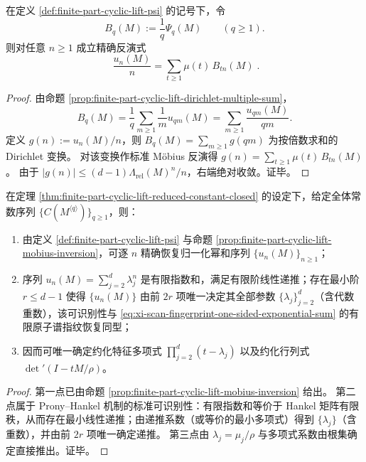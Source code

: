 \begin{proposition}\label{prop:finite-part-cyclic-lift-mobius-inversion}
在定义 \ref{def:finite-part-cyclic-lift-psi} 的记号下，令
\[
B_q(M):=\frac{1}{q}\Psi_q(M)\qquad(q\ge 1).
\]
则对任意 \(n\ge 1\) 成立精确反演式
\[
\boxed{\;
\frac{u_n(M)}{n}=\sum_{t\ge 1}\mu(t)\,B_{tn}(M)\; }.
\]
\end{proposition}
\begin{proof}
由命题 \ref{prop:finite-part-cyclic-lift-dirichlet-multiple-sum}，
\[
B_q(M)=\frac{1}{q}\sum_{m\ge 1}\frac{1}{m}u_{qm}(M)=\sum_{m\ge 1}\frac{u_{qm}(M)}{qm}.
\]
定义 \(g(n):=u_n(M)/n\)，则 \(B_q(M)=\sum_{m\ge 1}g(qm)\) 为按倍数求和的 Dirichlet 变换。
对该变换作标准 Möbius 反演得
\(
g(n)=\sum_{t\ge 1}\mu(t)\,B_{tn}(M)
\)。
由于 \(|g(n)|\le (d-1)\Lambda_{\mathrm{rel}}(M)^n/n\)，右端绝对收敛。证毕。
\end{proof}

\begin{theorem}\label{thm:finite-part-cyclic-lift-spectrum-identifiability}
在定理 \ref{thm:finite-part-cyclic-lift-reduced-constant-closed} 的设定下，给定全体常数序列 \(\{C(M^{\langle q\rangle})\}_{q\ge 1}\)，则：
\begin{enumerate}
  \item 由定义 \ref{def:finite-part-cyclic-lift-psi} 与命题 \ref{prop:finite-part-cyclic-lift-mobius-inversion}，可逐 \(n\) 精确恢复归一化幂和序列 \(\{u_n(M)\}_{n\ge 1}\)；
  \item 序列 \(u_n(M)=\sum_{j=2}^{d}\lambda_j^n\) 是有限指数和，满足有限阶线性递推；存在最小阶 \(r\le d-1\) 使得 \(\{u_n(M)\}\) 由前 \(2r\) 项唯一决定其全部参数 \(\{\lambda_j\}_{j=2}^{d}\)（含代数重数），该可识别性与 \eqref{eq:xi-scan-fingerprint-one-sided-exponential-sum} 的有限原子谱指纹恢复同型；
  \item 因而可唯一确定约化特征多项式 \(\prod_{j=2}^{d}(t-\lambda_j)\) 以及约化行列式 \(\det\nolimits'(I-tM/\rho)\)。
\end{enumerate}
\end{theorem}
\begin{proof}
第一点已由命题 \ref{prop:finite-part-cyclic-lift-mobius-inversion} 给出。
第二点属于 Prony--Hankel 机制的标准可识别性：有限指数和等价于 Hankel 矩阵有限秩，从而存在最小线性递推；由递推系数（或等价的最小多项式）得到 \(\{\lambda_j\}\)（含重数），并由前 \(2r\) 项唯一确定递推。
第三点由 \(\lambda_j=\mu_j/\rho\) 与多项式系数由根集确定直接推出。证毕。
\end{proof}

